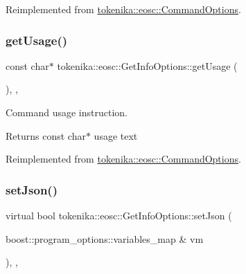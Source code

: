Reimplemented from \hyperlink{classtokenika_1_1eosc_1_1_command_options_a346dcfb00b8ac522169714544bfa7be0}{tokenika\+::eosc\+::\+Command\+Options}.

\mbox{\label{classtokenika_1_1eosc_1_1_get_info_options_aad995529f121f42cdd8f0b1380540370}} 
\subsubsection{\texorpdfstring{get\+Usage()}{getUsage()}}
{\footnotesize\ttfamily const char$\ast$ tokenika\+::eosc\+::\+Get\+Info\+Options\+::get\+Usage (\begin{DoxyParamCaption}{ }\end{DoxyParamCaption})\hspace{0.3cm}{\ttfamily [inline]}, {\ttfamily [protected]}, {\ttfamily [virtual]}}



Command \textquotesingle{}usage\textquotesingle{} instruction. 

\begin{DoxyReturn}{Returns}
const char$\ast$ usage text 
\end{DoxyReturn}


Reimplemented from \hyperlink{classtokenika_1_1eosc_1_1_command_options_a18ada0ba1163f7a41c9990ae2756012b}{tokenika\+::eosc\+::\+Command\+Options}.

\mbox{\label{classtokenika_1_1eosc_1_1_get_info_options_a15688c1262b3d861bd7de015e92dd6a7}} 
\subsubsection{\texorpdfstring{set\+Json()}{setJson()}}
{\footnotesize\ttfamily virtual bool tokenika\+::eosc\+::\+Get\+Info\+Options\+::set\+Json (\begin{DoxyParamCaption}\item[{boost\+::program\+\_\+options\+::variables\+\_\+map \&}]{vm }\end{DoxyParamCaption})\hspace{0.3cm}{\ttfamily [inline]}, {\ttfamily [protected]}, {\ttfamily [virtual]}}



